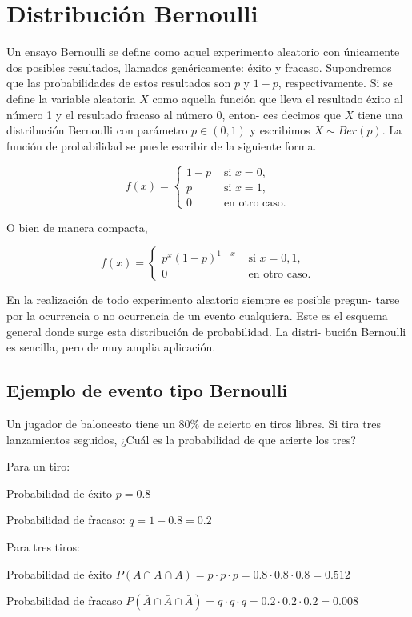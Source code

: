 \section{Distribución Bernoulli}

Un ensayo Bernoulli se define como aquel experimento aleatorio con únicamente
dos posibles resultados, llamados genéricamente: éxito y fracaso. Supondremos
que las probabilidades de estos resultados son $p$ y $1 - p$, respectivamente.
Si se define la variable aleatoria $X$ como aquella función que lleva el
resultado éxito al número 1 y el resultado fracaso al número 0, enton- ces
decimos que $X$ tiene una distribución Bernoulli con parámetro $p \in (0, 1)$ y
escribimos $X \sim Ber(p)$. La función de probabilidad se puede escribir de la
siguiente forma.

\begin{equation}
    f(x) = \left\lbrace
        \begin{array}{ll} 
            1-p & \text{ si } x = 0, \\
            p   & \text{ si } x=1, \\
            0   & \text{ en otro caso.}
        \end{array}\right.
\end{equation}

O bien de manera compacta,

\begin{equation}
    f(x) = \left\lbrace
        \begin{array}{ll} 
            p^x (1-p)^{1-x} & \text{ si } x = 0,1, \\
            0   & \text{ en otro caso.}
        \end{array}\right.
\end{equation}

En la realización de todo experimento aleatorio siempre es posible pregun-
tarse por la ocurrencia o no ocurrencia de un evento cualquiera. Este es el
esquema general donde surge esta distribución de probabilidad. La distri-
bución Bernoulli es sencilla, pero de muy amplia aplicación.

\subsection{Ejemplo de evento tipo Bernoulli}

Un jugador de baloncesto tiene un 80\% de acierto en tiros libres. Si tira tres
lanzamientos seguidos, ¿Cuál es la probabilidad de que acierte los tres?

Para un tiro:

Probabilidad de éxito $p=0.8$

Probabilidad de fracaso: $q = 1 - 0.8 = 0.2$

Para tres tiros:

Probabilidad de éxito $P(A \cap A \cap A) = p \cdot p \cdot p = 0.8 \cdot 0.8
\cdot 0.8 = 0.512$

Probabilidad de fracaso $P(\bar{A} \cap \bar{A} \cap \bar{A}) = q \cdot q \cdot q = 0.2 \cdot 0.2
\cdot 0.2 = 0.008$
